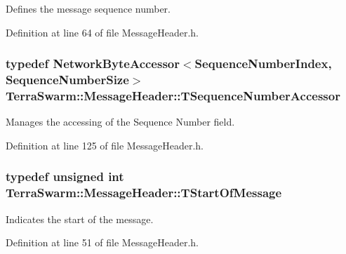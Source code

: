 Defines the message sequence number. 



Definition at line 64 of file Message\-Header.\-h.

\hypertarget{class_terra_swarm_1_1_message_header_afd4ad43e1cb866a290b7d124af9661f6}{
\subsubsection[{T\-Sequence\-Number\-Accessor}]{\setlength{\rightskip}{0pt plus 5cm}typedef {\bf Network\-Byte\-Accessor}$<${\bf Sequence\-Number\-Index}, {\bf Sequence\-Number\-Size}$>$ {\bf Terra\-Swarm\-::\-Message\-Header\-::\-T\-Sequence\-Number\-Accessor}\hspace{0.3cm}{\ttfamily [private]}}}\label{class_terra_swarm_1_1_message_header_afd4ad43e1cb866a290b7d124af9661f6}


Manages the accessing of the Sequence Number field. 



Definition at line 125 of file Message\-Header.\-h.

\hypertarget{class_terra_swarm_1_1_message_header_a2cf24e4a2eb361223ae61052630dfe24}{
\subsubsection[{T\-Start\-Of\-Message}]{\setlength{\rightskip}{0pt plus 5cm}typedef unsigned int {\bf Terra\-Swarm\-::\-Message\-Header\-::\-T\-Start\-Of\-Message}\hspace{0.3cm}{\ttfamily [private]}}}\label{class_terra_swarm_1_1_message_header_a2cf24e4a2eb361223ae61052630dfe24}


Indicates the start of the message. 



Definition at line 51 of file Message\-Header.\-h.

